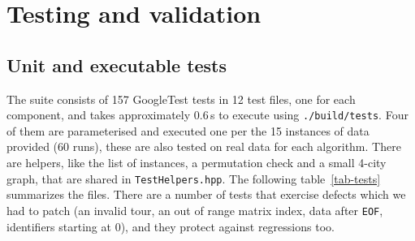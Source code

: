 \documentclass[10pt,a4paper]{article}
\makeatletter
\let\tsp@section\section
\renewcommand{\section}{\FloatBarrier\tsp@section}
\makeatother
\begin{document}
\section{Testing and validation}\label{sec-testing}

\subsection{Unit and executable tests}

The suite consists of 157 GoogleTest tests in 12 test files, one for each component, and takes approximately 0.6\,s to execute using \texttt{./build/tests}. Four of them are parameterised and executed one per the 15 instances of data provided (60 runs), these are also tested on real data for each algorithm. There are helpers, like the list of instances, a permutation check and a small 4-city graph, that are shared in \texttt{TestHelpers.hpp}. The following table~\ref{tab-tests} summarizes the files. There are a number of tests that exercise defects which we had to patch (an invalid tour, an out of range matrix index, data after \texttt{EOF}, identifiers starting at 0), and they protect against regressions too.
\end{document}
